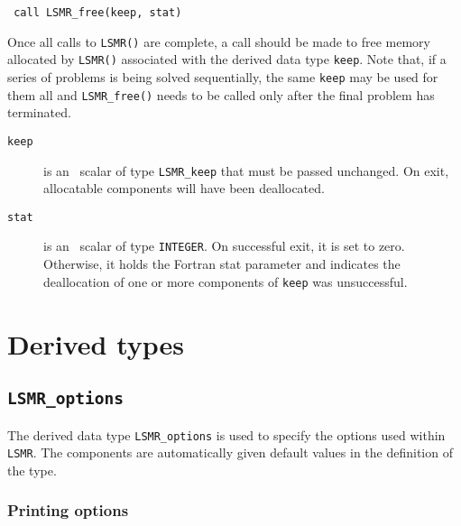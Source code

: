       \texttt{ \hspace*{0.2cm}
         call LSMR\_free(keep, stat)
      }
\vspace{0.2cm}

\noindent
Once all  calls to \texttt{LSMR()} are complete,
a call should be made to free memory  allocated by
\texttt{LSMR()}  associated with the derived data type {\tt keep}.
Note that, if a series of problems is being solved sequentially, the same {\tt keep}
may be used for them all and {\tt LSMR\_free()} needs to be called only
after the final problem has terminated.

\begin{description}

\item[\texttt{keep}] is an \intentinout\ scalar  of type {\tt LSMR\_keep}
that must be passed unchanged.
On exit, allocatable components will have been deallocated.

\item[\texttt{stat}] is an \intentout\ scalar of type {\tt INTEGER}.
On successful exit, it is set to zero. Otherwise, it holds the Fortran stat
parameter and indicates the deallocation of one or more components of
{\tt keep} was unsuccessful.

\end{description}




\section{Derived types}
\subsection{\texttt{LSMR\_options}}
\label{LSMR:type:options}

The derived data type {\tt LSMR\_options} is used to specify the options used
within \texttt{LSMR}. The components are automatically
given default values in the definition of the type.

\subsubsection*{Printing options}

